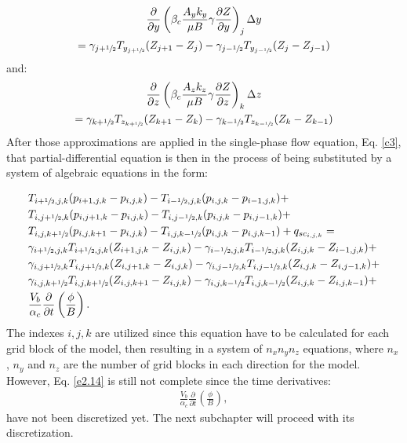 	\begin{multline}
\label{e2.5b}
\frac{\partial}{\partial y}\left( \beta_c \frac{A_y k_y}{\mu B}\gamma\frac{\partial Z}{\partial y}\right)_j \Delta y \\ =  \gamma_{j+\sfrac{1}{2}} T_{y_{j+\sfrac{1}{2}}} (Z_{j+1}-Z_j) - \gamma_{j-\sfrac{1}{2}} T_{y_{j-\sfrac{1}{2}}} (Z_j-Z_{j-1})
\end{multline}
and:
	\begin{multline}
\label{e2.5c}
\frac{\partial}{\partial z}\left( \beta_c \frac{A_z k_z}{\mu B}\gamma\frac{\partial Z}{\partial z}\right)_k \Delta z \\ =  \gamma_{k+\sfrac{1}{2}} T_{z_{k+\sfrac{1}{2}}} (Z_{k+1}-Z_k) - \gamma_{k-\sfrac{1}{2}} T_{z_{k-\sfrac{1}{2}}} (Z_k-Z_{k-1})
\end{multline}
After those approximations are applied in the single-phase flow equation, Eq. \ref{c3}, that partial-differential equation is then in the process of being substituted by a system of algebraic equations in the form:


	\begin{align}\nonumber
	\label{e2.14}
	& T_{i+\sfrac{1}{2},j,k}(p_{i+1,j,k}-p_{i,j,k}) - T_{i-\sfrac{1}{2},j,k}(p_{i,j,k}-p_{i-1,j,k}) \nonumber +\\ &
	T_{i,j+\sfrac{1}{2},k}(p_{i,j+1,k}-p_{i,j,k}) - T_{i,j-\sfrac{1}{2},k}(p_{i,j,k}-p_{i,j-1,k}) \nonumber +\\ &
	T_{i,j,k+\sfrac{1}{2}}(p_{i,j,k+1}-p_{i,j,k}) - T_{i,j,k-\sfrac{1}{2}}(p_{i,j,k}-p_{i,j,k-1})
	 \nonumber +
	q_{sc_{i,j,k}} =\\ &
	\gamma_{i+\sfrac{1}{2},j,k} T_{i+\sfrac{1}{2},j,k}(Z_{i+1,j,k}-Z_{i,j,k}) - \gamma_{i-\sfrac{1}{2},j,k} T_{i-\sfrac{1}{2},j,k}(Z_{i,j,k}-Z_{i-1,j,k}) \nonumber +\\ &
	\gamma_{i,j+\sfrac{1}{2},k} T_{i,j+\sfrac{1}{2},k}(Z_{i,j+1,k}-Z_{i,j,k}) - \gamma_{i,j-\sfrac{1}{2},k} T_{i,j-\sfrac{1}{2},k}(Z_{i,j,k}-Z_{i,j-1,k}) \nonumber +\\ &
	\gamma_{i,j,k+\sfrac{1}{2}} T_{i,j,k+\sfrac{1}{2}}(Z_{i,j,k+1}-Z_{i,j,k}) - \gamma_{i,j,k-\sfrac{1}{2}} T_{i,j,k-\sfrac{1}{2}}(Z_{i,j,k}-Z_{i,j,k-1}) \nonumber +\\ &
	\frac {V_b}{\alpha_c}\frac{\partial}{\partial t}\left( \frac{\phi}{B}\right).
	\end{align}	
The indexes $i,j,k$ are utilized since this equation have to be calculated for each grid block of the model, then resulting in a system of $n_x n_y n_z$ equations, where $n_x$, $n_y$ and $n_z$ are the number of grid blocks in each direction for the model. However, Eq. \ref{e2.14} is still not complete since the time derivatives:
\begin{align}\nonumber
\frac {V_b}{\alpha_c}\frac{\partial}{\partial t}\left( \frac{\phi}{B}\right),
\end{align}
have not been discretized yet. The next subchapter will proceed with its discretization.

